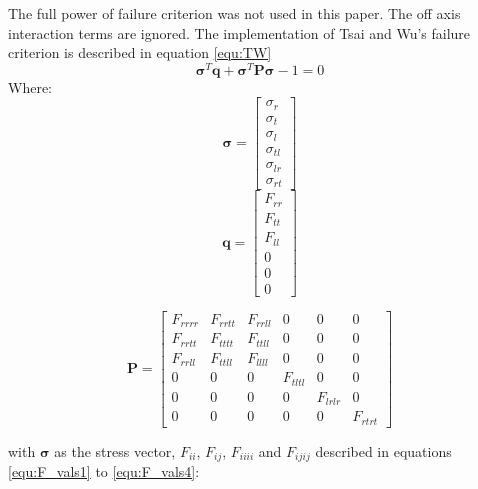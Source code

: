 \documentclass[10pt]{article}
\begin{document}
The full power of \citet{tsai_general_1971} failure criterion was not used in this paper. The off axis interaction terms are ignored.
The implementation of Tsai and Wu's failure criterion is described in equation \ref{equ:TW}
\begin{equation}\label{equ:TW}
\boldsymbol{\sigma}^T\boldsymbol{q} + \boldsymbol{\sigma}^T\boldsymbol{P\sigma} -1 = 0
\end{equation}
Where:
\begin{equation}\label{equ:stress_vec}
\boldsymbol{\sigma}=\begin{bmatrix}
	\sigma_{r}\\
	\sigma_{t}\\
	\sigma_{l}\\
	\sigma_{tl}\\
	\sigma_{lr}\\
	\sigma_{rt}
	\end{bmatrix}
\end{equation}
\hspace{0.2cm}
\begin{equation}\label{equ:q_vec}
\boldsymbol{q}=\begin{bmatrix}
	F_{rr}\\
	F_{tt}\\
	F_{ll}\\
	0\\
	0\\
	0
	\end{bmatrix}
\end{equation}

\begin{equation}\label{equ:P_mat}
\boldsymbol{P}=\begin{bmatrix}
	F_{rrrr}&F_{rrtt}&F_{rrll}&0&0&0\\
	F_{rrtt}&F_{tttt}&F_{ttll}&0&0&0\\
	F_{rrll}&F_{ttll}&F_{llll}&0&0&0\\
	0&0&0&F_{tltl}&0&0\\
	0&0&0&0&F_{lrlr}&0\\
	0&0&0&0&0&F_{rtrt}
	\end{bmatrix}
\end{equation}

with \(\boldsymbol{\sigma}\) as the stress vector, \(F_{ii}\), \(F_{ij}\), \(F_{iiii}\) and \(F_{ijij}\) described in
equations \ref{equ:F_vals1} to \ref{equ:F_vals4}:
\end{document}
